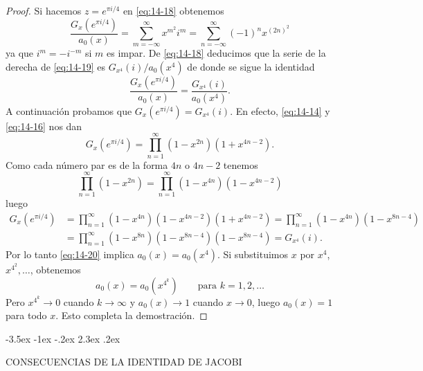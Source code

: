 \documentclass[12pt,a4paper]{book}
\makeatletter
\renewcommand\section{\@startsection{section}{1}{\z@}%
  {-3.5ex \@plus -1ex \@minus -.2ex}%
  {2.3ex \@plus .2ex}%
  {\normalfont\Large\bfseries\raggedright}}
\makeatother
\begin{document}
\begin{proof}
        Si hacemos $z=e^{\pi i/4}$ en \eqref{eq:14-18} obtenemos
        \begin{equation}\label{eq:14-19}
            \frac{G_{x}(e^{\pi i/4})}{a_{0}(x)}=\sum_{m=-\infty}^{\infty}x^{m^{2}}i^{m}=\sum_{n=-\infty}^{\infty}(-1)^{n}x^{(2n)^{2}}
        \end{equation}
        ya que $i^{m}=-i^{-m}$ si $m$ es impar. De \eqref{eq:14-18} deducimos que la serie de la
        derecha de \eqref{eq:14-19} es $G_{x^{4}}(i)/a_{0}(x^{4})$ de donde se sigue la identidad
        \begin{equation}\label{eq:14-20}
            \frac{G_{x}(e^{\pi i/4})}{a_{0}(x)}=\frac{G_{x^{4}}(i)}{a_{0}(x^{4})}.
        \end{equation}
        A continuación probamos que $G_{x}(e^{\pi i/4})=G_{x^{4}}(i)$. En efecto, \eqref{eq:14-14} y
        \eqref{eq:14-16} nos dan
        \begin{equation*}
            G_{x}(e^{\pi i/4})=\prod_{n=1}^{\infty}(1-x^{2n})(1+x^{4n-2}).
        \end{equation*}
        Como cada número par es de la forma $4n$ o $4n-2$ tenemos
        \begin{equation*}
            \prod_{n=1}^{\infty}(1-x^{2n})=\prod_{n=1}^{\infty}(1-x^{4n})(1-x^{4n-2})
        \end{equation*}
        luego
        \begin{align*}
            G_{x}(e^{\pi i/4})&=\prod_{n=1}^{\infty}(1-x^{4n})(1-x^{4n-2})(1+x^{4n-2})=\prod_{n=1}^{\infty}(1-x^{4n})(1-x^{8n-4})\\
            &=\prod_{n=1}^{\infty}(1-x^{8n})(1-x^{8n-4})(1-x^{8n-4})=G_{x^{4}}(i).
        \end{align*}
        Por lo tanto \eqref{eq:14-20} implica $a_{0}(x)=a_{0}(x^{4})$. Si substituimos $x$ por $x^{4}$,
        $x^{4^{2}},\dots$, obtenemos
        \begin{equation*}
            a_{0}(x)=a_{0}(x^{4^{k}})\qquad\text{para }k=1,2,\dots
        \end{equation*}
        Pero $x^{4^{k}}\to0$ cuando $k\to\infty$ y $a_{0}(x)\to1$ cuando $x\to0$, luego $a_{0}(x)=1$
        para todo $x$. Esto completa la demostración.
    \end{proof}

    \section{CONSECUENCIAS DE LA IDENTIDAD DE JACOBI}
\end{document}
